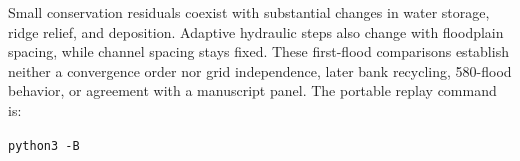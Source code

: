 Small conservation residuals coexist with substantial changes in
water storage, ridge relief, and deposition. Adaptive hydraulic steps
also change with floodplain spacing, while channel spacing stays fixed.
These first-flood comparisons establish neither a convergence order
nor grid independence, later bank recycling, 580-flood behavior, or
agreement with a manuscript panel.
The portable replay command is:
\par\noindent\texttt{python3 -B}\ 
